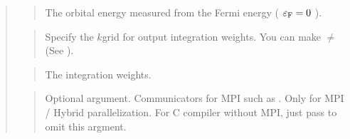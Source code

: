 \documentclass[letterpaper,10pt,pdftex,openany,english]{sphinxmanual}
\begin{document}
\begin{quote}
\begin{sphinxVerbatim}[commandchars=\\\{\}]
\end{sphinxVerbatim}
\begin{quote}

\sphinxAtStartPar
The orbital energy measured from the Fermi energy
( \(\varepsilon_{\rm F} = 0\) ).
\end{quote}

\begin{sphinxVerbatim}[commandchars=\\\{\}]
\end{sphinxVerbatim}
\begin{quote}

\sphinxAtStartPar
Specify the \(k\)\sphinxhyphen{}grid for output integration weights.
You can make  \(\neq\)  (See {\hyperref[\detokenize{app:app}]{}}).
\end{quote}

\begin{sphinxVerbatim}[commandchars=\\\{\}]
\end{sphinxVerbatim}
\begin{quote}

\sphinxAtStartPar
The integration weights.
\end{quote}

\begin{sphinxVerbatim}[commandchars=\\\{\}]
\end{sphinxVerbatim}
\begin{quote}

\sphinxAtStartPar
Optional argument. Communicators for MPI such as .
Only for MPI / Hybrid parallelization.
For C compiler without MPI, just pass  to omit this argment.
\end{quote}
\end{quote}
\end{document}
